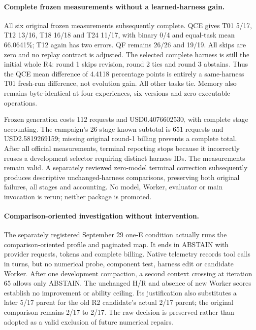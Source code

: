 \paragraph{Complete frozen measurements without a learned-harness gain.}
All six original frozen measurements subsequently complete. QCE gives T01
5/17, T12 13/16, T18 16/18 and T24 11/17, with binary 0/4 and equal-task mean
66.0641\%; T12 again has two errors. QF remains 26/26 and 19/19. All skips
are zero and no replay contract is adjusted. The selected complete harness
is still the initial whole R4: round 1 skips revision, round 2 ties and
round 3 abstains. Thus the QCE mean difference of 4.4118 percentage points
is entirely a same-harness T01 fresh-run difference, not evolution gain.
All other tasks tie. Memory also remains byte-identical at four experiences,
six versions and zero executable operations.

Frozen generation costs 112 requests and USD0.4076602530, with complete
stage accounting. The campaign's 26-stage known subtotal is 651 requests
and USD2.5819269159; missing original round-1 billing prevents a complete
total. After all official measurements, terminal reporting stops because it
incorrectly reuses a development selector requiring distinct harness IDs.
The measurements remain valid. A separately reviewed zero-model terminal
correction subsequently produces descriptive unchanged-harness comparisons,
preserving both original failures, all stages and accounting. No model,
Worker, evaluator or main invocation is rerun; neither package is promoted.

\paragraph{Comparison-oriented investigation without intervention.}
The separately registered September 29 one-E condition actually runs the
comparison-oriented profile and paginated map. It ends in ABSTAIN with
\ResearchComparisonOneERequests{} provider requests,
\ResearchComparisonOneETokens{} tokens and
\ResearchComparisonOneECost{} complete billing. Native telemetry records
\ResearchComparisonOneEToolCalls{} tool calls in
\ResearchComparisonOneETurns{} turns, but no numerical probe, component test,
harness edit or candidate Worker. After one development compaction, a second
context crossing at iteration 65 allows only ABSTAIN. The unchanged H/R and
absence of new Worker scores establish no improvement or ability ceiling.
Its justification also substitutes a later 5/17 parent for the old R2
candidate's actual 2/17 parent; the original comparison remains 2/17 to 2/17.
The raw decision is preserved rather than adopted as a valid exclusion of
future numerical repairs.

